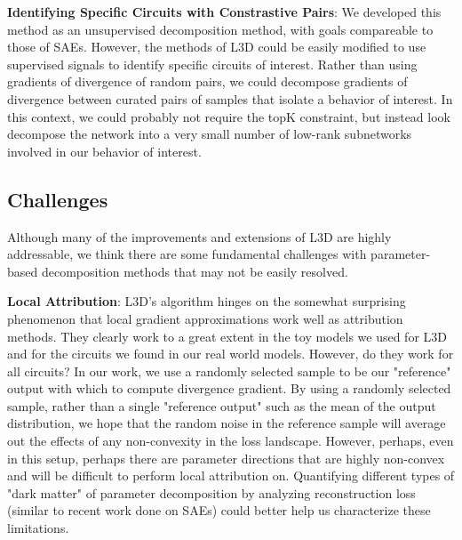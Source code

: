 \documentclass{article}
\theoremstyle{plain}
\theoremstyle{definition}
\theoremstyle{remark}
\begin{document}
\textbf{Identifying Specific Circuits with Constrastive Pairs}:
We developed this method as an unsupervised decomposition method, with goals compareable to those of SAEs. However, the methods of L3D could be easily modified to use supervised signals to identify specific circuits of interest. Rather than using gradients of divergence of random pairs, we could decompose gradients of divergence between curated pairs of samples that isolate a behavior of interest. In this context, we could probably not require the topK constraint, but instead look decompose the network into a very small number of low-rank subnetworks involved in our behavior of interest. 

\subsection{Challenges}
Although many of the improvements and extensions of L3D are highly addressable, we think there are some fundamental challenges with parameter-based decomposition methods that may not be easily resolved.


\textbf{Local Attribution}: L3D's algorithm hinges on the somewhat surprising phenomenon that local gradient approximations work well as attribution methods. They clearly work to a great extent in the toy models we used for L3D and for the circuits we found in our real world models. However, do they work for all circuits? In our work, we use a randomly selected sample to be our "reference" output with which to compute divergence gradient. By using a randomly selected sample, rather than a single "reference output" such as the mean of the output distribution, we hope that the random noise in the reference sample will average out the effects of any non-convexity in the loss landscape.  However, perhaps, even in this setup, perhaps there are parameter directions that are highly non-convex and will be difficult to perform local attribution on. Quantifying different types of "dark matter" of parameter decomposition by analyzing reconstruction loss (similar to recent work done on SAEs) could better help us characterize these limitations.
\end{document}
